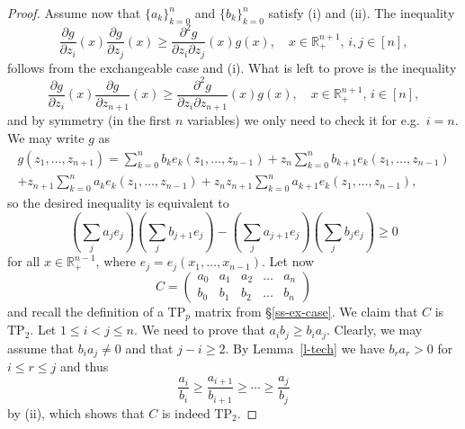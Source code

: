 \documentclass[10pt,reqno]{amsart}
\theoremstyle{plain}
\theoremstyle{definition}
\theoremstyle{remark}
\newcommand{\TP}{\text{TP}}
\newcommand{\RR}{\mathbb{R}}
\begin{document}
\begin{proof}
Assume now that $\{a_k\}_{k=0}^{n}$ and $\{b_k\}_{k=0}^n$ satisfy (i) and 
(ii). The inequality 
$$
\frac {\partial g} {\partial z_i}(x) \frac {\partial g} {\partial z_j}(x) 
\geq \frac {\partial^2 g} {\partial z_i \partial z_j}(x) g(x), 
\quad x\in \RR_+^{n+1}, \,i,j \in [n],
$$
follows from the exchangeable case and (i). What is left to prove is the 
inequality 
$$
\frac {\partial g} {\partial z_i}(x) \frac {\partial g} {\partial z_{n+1}}(x) 
\geq \frac {\partial^2 g} {\partial z_i \partial z_{n+1}}(x) g(x), 
\quad x\in \RR_+^{n+1},\, i\in [n], 
$$
and by symmetry (in the first $n$ variables) we only need to check it for
e.g.~$i=n$. We may write $g$ as 
\begin{multline*}
g(z_1,\ldots,z_{n+1})= \sum_{k=0}^{n} b_k e_k(z_1, \ldots, z_{n-1})+
z_n\sum_{k=0}^{n} b_{k+1} e_k(z_1, \ldots, z_{n-1}) \\
+ z_{n+1}\sum_{k=0}^n a_k e_k(z_1, \ldots, z_{n-1})+ z_nz_{n+1} 
\sum_{k=0}^n a_{k+1} e_k(z_1, \ldots, z_{n-1}),
\end{multline*}
so the desired inequality is equivalent to 
\begin{equation}\label{eqq}
\left(\sum_j a_je_j\right)\!\left(\sum_j b_{j+1}e_j\right)
-\left(\sum_j a_{j+1}e_j\right)\!\left(\sum_j b_je_j\right)\geq 0
\end{equation}
for all $x \in \RR_+^{n-1}$, where $e_j=e_j(x_1,\ldots, x_{n-1})$. Let now
 $$C=\left( \begin{array}{ccccc}
  a_0 & a_1 & a_2 & \ldots & a_n \\
  b_0 & b_1 & b_2 & \ldots  & b_n
\end{array} \right)$$
and recall the definition of a $\TP_p$ matrix from \S \ref{ss-ex-case}.
We claim that $C$ is $\TP_2$. Let $1 \leq i<j \leq n$. We need to 
prove that 
$a_ib_j \geq b_ia_j$. Clearly, we may assume that $b_ia_j \neq 0$ and that 
$j-i \geq 2$. By Lemma~\ref{l-tech} we have $b_ra_r>0$ for $i\le r\le j$ and
thus 
$$
\frac {a_i} {b_i} \geq \frac {a_{i+1}} {b_{i+1}} \geq \cdots 
\geq \frac {a_j} {b_j}
$$
by (ii), which shows that $C$ is indeed $\TP_2$. 

\end{proof}
\end{document}
